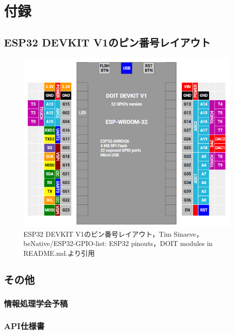 \section{付録}
  \label{付録}
    \subsection{ESP32 DEVKIT V1のピン番号レイアウト}
      \label{sec:ESP32 DEVKIT V1のピン番号レイアウト}
        \begin{figure}[htbp]
          \centering
          \includegraphics[scale=1]
          {figures/DOIT-DEVKIT-V1-32.png}
          \caption{ESP32 DEVKIT V1のピン番号レイアウト，Tim Sinaeve，beNative/ESP32-GPIO-list: ESP32 pinouts，DOIT modules in README.md.より引用}
          \label{fig:ピン番号レイアウト}
        \end{figure}

    \subsection{その他}
      \label{sec:その他}
       \subsubsection{情報処理学会予稿}
        \label{情報処理学会予稿}
  
       \subsubsection{API仕様書}
        \label{sec:API仕様書}

